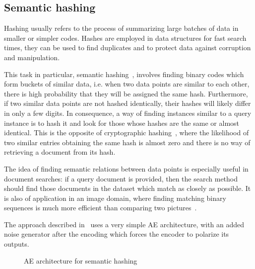 \subsection{Semantic hashing}

Hashing usually refers to the process of summarizing large batches of data in smaller or simpler codes. Hashes are employed in data structures for fast search times, they can be used to find duplicates and to protect data against corruption and manipulation.

This task in particular, semantic hashing~, involves finding binary codes which form buckets of similar data, i.e. when two data points are similar to each other, there is high probability that they will be assigned the same hash. Furthermore, if two similar data points are not hashed identically, their hashes will likely differ in only a few digits. In consequence, a way of finding instances similar to a query instance is to hash it and look for those whose hashes are the same or almost identical. This is the opposite of cryptographic hashing~, where the likelihood of two similar entries obtaining the same hash is almost zero and there is no way of retrieving a document from its hash.

The idea of finding semantic relations between data points is especially useful in document searches: if a query document is provided, then the search method should find those documents in the dataset which match as closely as possible. It is also of application in an image domain, where finding matching binary sequences is much more efficient than comparing two pictures~.

The approach described in~ uses a very simple AE architecture, with an added noise generator after the encoding which forces the encoder to polarize its outputs. 



\begin{figure}[ht]
    \centering\small
    \caption{AE architecture for semantic hashing}
    \label{fig:semantic}
\end{figure}

